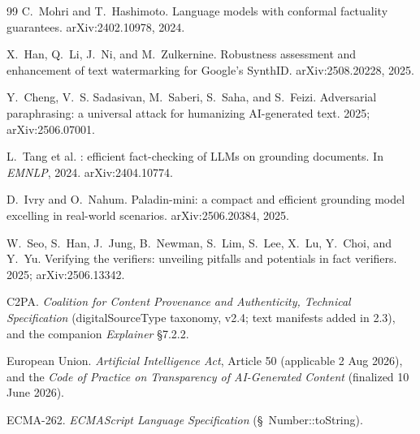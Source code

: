\documentclass[11pt]{article}
\theoremstyle{definition}
\begin{document}
\begin{thebibliography}{99}
C.~Mohri and T.~Hashimoto.
\newblock Language models with conformal factuality guarantees.
\newblock arXiv:2402.10978, 2024.

X.~Han, Q.~Li, J.~Ni, and M.~Zulkernine.
\newblock Robustness assessment and enhancement of text watermarking for
  {Google's} {SynthID}.
\newblock arXiv:2508.20228, 2025.

Y.~Cheng, V.~S. Sadasivan, M.~Saberi, S.~Saha, and S.~Feizi.
\newblock Adversarial paraphrasing: a universal attack for humanizing
  {AI}-generated text.
 2025; arXiv:2506.07001.

L.~Tang et al.
: efficient fact-checking of {LLMs} on grounding
  documents.
\newblock In \emph{EMNLP}, 2024. arXiv:2404.10774.

D.~Ivry and O.~Nahum.
\newblock Paladin-mini: a compact and efficient grounding model excelling in
real-world scenarios.
\newblock arXiv:2506.20384, 2025.

W.~Seo, S.~Han, J.~Jung, B.~Newman, S.~Lim, S.~Lee, X.~Lu, Y.~Choi, and
Y.~Yu.
\newblock Verifying the verifiers: unveiling pitfalls and potentials in fact
  verifiers.
 2025; arXiv:2506.13342.

{C2PA}.
\newblock \emph{Coalition for Content Provenance and Authenticity, Technical
  Specification} (digitalSourceType taxonomy, v2.4; text manifests added in
  2.3), and the companion \emph{Explainer} \S7.2.2.

European Union.
\newblock \emph{Artificial Intelligence Act}, Article 50 (applicable 2 Aug
  2026), and the \emph{Code of Practice on Transparency of AI-Generated
  Content} (finalized 10 June 2026).

{ECMA-262}.
\newblock \emph{ECMAScript Language Specification} (\S~Number::toString).

\end{thebibliography}
\end{document}
